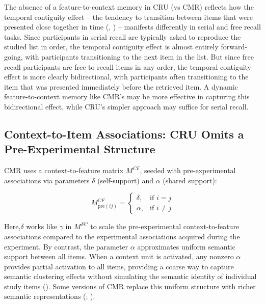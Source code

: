 \documentclass[
  man,
  floatsintext,
  longtable,
  nolmodern,
  notxfonts,
  notimes,
  draftfirst,
  colorlinks=true,linkcolor=blue,citecolor=blue,urlcolor=blue]{apa7}
\begin{document}
The absence of a feature-to-context memory in CRU (vs CMR) reflects how
the temporal contiguity effect -- the tendency to transition between
items that were presented close together in time
(,
) -- manifests differently
in serial and free recall tasks. Since participants in serial recall are
typically asked to reproduce the studied list in order, the temporal
contiguity effect is almost entirely forward-going, with participants
transitioning to the next item in the list. But since free recall
participants are free to recall items in any order, the temporal
contiguity effect is more clearly bidirectional, with participants often
transitioning to the item that was presented immediately before the
retrieved item. A dynamic feature-to-context memory like CMR's may be
more effective in capturing this bidirectional effect, while CRU's
simpler approach may suffice for serial recall.

\subsection{Context-to-Item Associations: CRU Omits a Pre-Experimental
Structure}\label{context-to-item-associations-cru-omits-a-pre-experimental-structure}

CMR uses a context-to-feature matrix \(M^{CF}\), seeded with
pre-experimental associations via parameters \(\delta\) (self-support)
and \(\alpha\) (shared support):

\[
M^{CF}_{\text{pre}(ij)} =
\begin{cases}
  \delta, & \text{if } i=j \\
  \alpha, & \text{if } i \neq j
\end{cases}
\]

Here,\(\delta\) works like \(\gamma\) in \(M^{FC}\) to scale the
pre-experimental context-to-feature associations compared to the
experimental associations acquired during the experiment. By contrast,
the parameter \(\alpha\) approximates uniform semantic support between
all items. When a context unit is activated, any nonzero \(\alpha\)
provides partial activation to all items, providing a coarse way to
capture semantic clustering effects without simulating the semantic
identity of individual study items
(). Some versions of
CMR replace this uniform structure with richer semantic representations
(;
).
\end{document}
